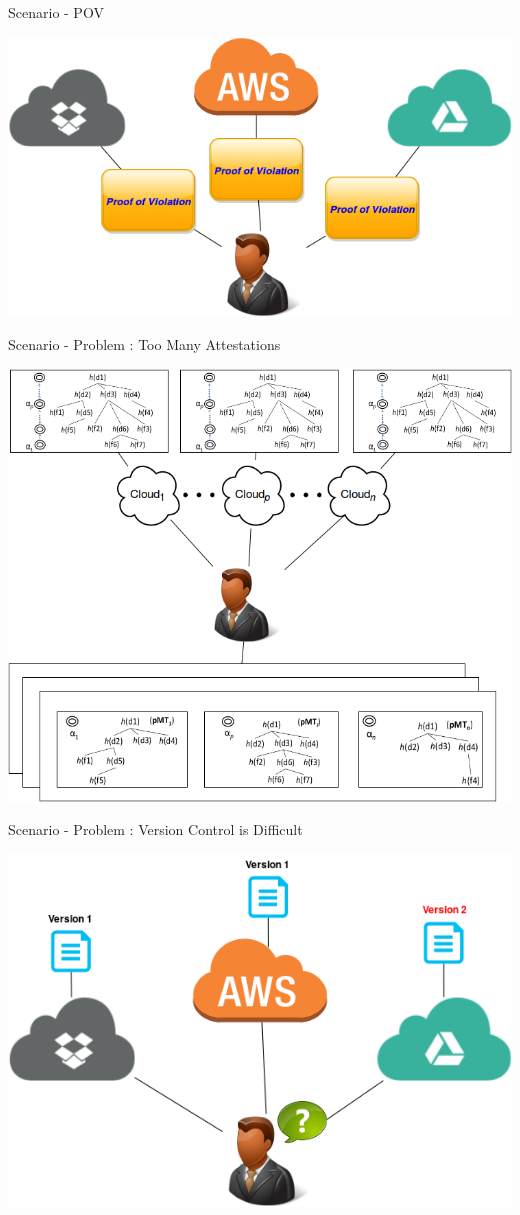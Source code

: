 \documentclass{beamer}
\newcommand{\RNum}[1]{\uppercase\expandafter{\romannumeral #1\relax}}
\begin{document}
\begin{frame}{Scenario - POV}
	\begin{center}
	\includegraphics[width=.95\textwidth]{Scenario3.png}
	\end{center}
\end{frame}

\begin{frame}{Scenario - Problem \RNum{1} : Too Many Attestations}
	\begin{center}
	\includegraphics[width=.7\textwidth]{Scenario4.png}
	\end{center}
\end{frame}

\begin{frame}{Scenario - Problem \RNum{2} : Version Control is Difficult}
	\begin{center}
	\includegraphics[width=.8\textwidth]{Scenario5.png}
	\end{center}
\end{frame}
\end{document}
